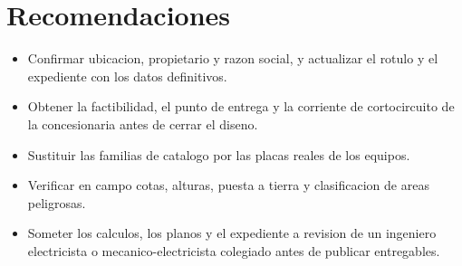 \section{Recomendaciones}
\begin{itemize}
\item Confirmar ubicacion, propietario y razon social, y actualizar el rotulo
  y el expediente con los datos definitivos.
\item Obtener la factibilidad, el punto de entrega y la corriente de
  cortocircuito de la concesionaria antes de cerrar el diseno.
\item Sustituir las familias de catalogo por las placas reales de los equipos.
\item Verificar en campo cotas, alturas, puesta a tierra y clasificacion de
  areas peligrosas.
\item Someter los calculos, los planos y el expediente a revision de un
  ingeniero electricista o mecanico-electricista colegiado antes de publicar
  entregables.
\end{itemize}
